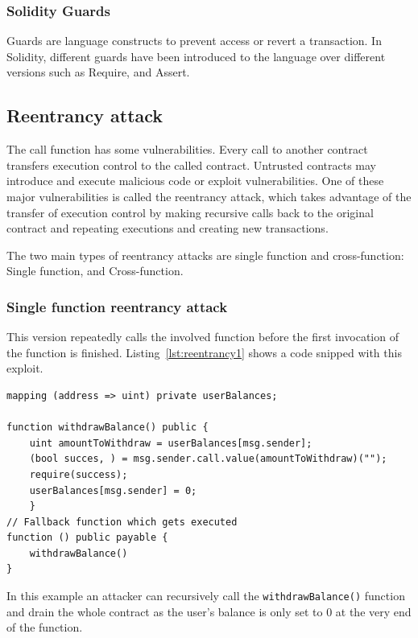 \documentclass[10pt,conference]{IEEEtran}
\begin{document}
\subsubsection{Solidity Guards}

Guards are language constructs to prevent access or revert a transaction.  In Solidity,  different guards have been introduced to the language over different versions such as Require,  and Assert.



\subsection{Reentrancy attack}

The call function has some vulnerabilities.  Every call to another contract transfers execution control to the called contract. Untrusted contracts may introduce and execute malicious code or exploit vulnerabilities.  One of these major vulnerabilities is called the reentrancy attack, which takes advantage of the transfer of execution control by making recursive calls back to the original contract and repeating executions and creating new transactions. 

The two main types of reentrancy attacks are single function and cross-function: Single function,  and Cross-function.

\subsubsection{Single function reentrancy attack}
This version repeatedly calls the involved function before the first invocation of the function is finished.  Listing~\ref{lst:reentrancy1} shows a code snipped with this exploit.

\begin{lstlisting}[language=Solidity, caption=Single function reentrancy attack, label=lst:reentrancy1]
mapping (address => uint) private userBalances;

function withdrawBalance() public {
    uint amountToWithdraw = userBalances[msg.sender];
    (bool succes, ) = msg.sender.call.value(amountToWithdraw)("");
    require(success);
    userBalances[msg.sender] = 0;
    }
// Fallback function which gets executed
function () public payable {
    withdrawBalance()
}
\end{lstlisting}

In this example an attacker can recursively call the \texttt{withdrawBalance()} function and drain the whole contract as the user's balance is only set to 0 at the very end of the function.
\end{document}
